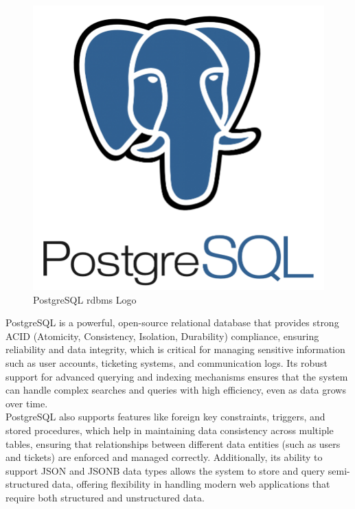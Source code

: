 	\begin{figure}[H]
		\centering
		\includegraphics[scale=0.1]{graphics/postgresql.png}
		\caption{PostgreSQL \acs{rdbms} Logo}
		\label{fig:postgresql}
	\end{figure}
	
	PostgreSQL is a powerful, open-source relational database that provides strong ACID (Atomicity, Consistency, Isolation, Durability) compliance, ensuring reliability and data integrity, which is critical for managing sensitive information such as user accounts, ticketing systems, and communication logs. Its robust support for advanced querying and indexing mechanisms ensures that the system can handle complex searches and queries with high efficiency, even as data grows over time. \cite{postgres}\\
	
	PostgreSQL also supports features like foreign key constraints, triggers, and stored procedures, which help in maintaining data consistency across multiple tables, ensuring that relationships between different data entities (such as users and tickets) are enforced and managed correctly. Additionally, its ability to support JSON and JSONB data types allows the system to store and query semi-structured data, offering flexibility in handling modern web applications that require both structured and unstructured data. \\
	
